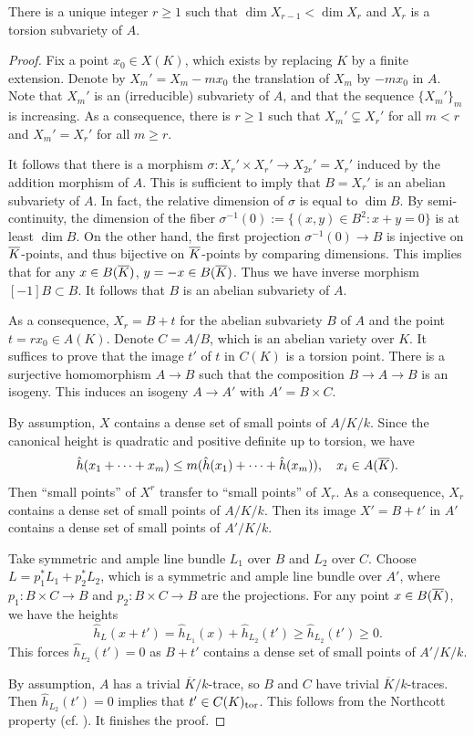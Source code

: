 \begin{lem}
\notready \label{addition}
There is a unique integer $r\geq 1$ such that $\dim X_{r-1}<\dim X_r$ and $X_r$ is a torsion subvariety of $A$.
\end{lem}
\begin{proof}
Fix a point $x_0\in X(K)$, which exists by replacing $K$ by a finite extension.
Denote by
$X_m'=X_m-mx_0$
the translation of $X_m$ by $-mx_0$ in $A$.
Note that $X_m'$ is an (irreducible) subvariety of $A$, and that the sequence
$\{X_m'\}_m$ is increasing.
As a consequence, there is $r\geq 1$ such that $X_m'\subsetneq X_r'$ for all $m<r$ and $X_m'= X_r'$ for all $m\geq r$.

It follows that there is a morphism $\sigma: X_r' \times X_r' \to X_{2r}' = X_r'$ induced by the addition morphism of $A$. This is sufficient to imply that $B=X_r'$ is an abelian subvariety of $A$.
In fact, the relative dimension of $\sigma$ is equal to $\dim B$.
By semi-continuity, the dimension of the fiber $\sigma^{-1}(0):=\{(x,y)\in B^2:x+y=0\}$ is at least $\dim B$.
On the other hand, the first projection $\sigma^{-1}(0)\to B$ is injective on ${\overline{K}}$-points, and thus bijective on ${\overline{K}}$-points by comparing dimensions.
This implies that for any $x\in B({\overline{K}})$, $y=-x\in B({\overline{K}})$.
Thus we have inverse morphism $[-1]B \subset B$.
It follows that $B$ is an abelian subvariety of $A$.

As a consequence, $X_r=B+t$ for the abelian subvariety $B$ of $A$ and the point $t=rx_0\in A(K)$.
Denote $C=A/B$, which is an abelian variety over $K$.
It suffices to prove that the image $t'$ of $t$ in $C(K)$ is a torsion point.
There is a surjective homomorphism $A \to B$ such that the composition $B\to A \to B$ is an isogeny.
This induces an isogeny $A\to A'$ with $A'=B\times C$.

By assumption, $X$ contains a dense set of small points of $A/K/k$.
Since the canonical height is quadratic and positive definite up to torsion, we have
$$
\hat h(x_1+ \cdots+ x_m)\leq  m(\hat h(x_1)+ \cdots +\hat h(x_m)), \quad x_i\in A({\overline{K}}).
$$
Then ``small points'' of $X^r$ transfer to ``small points'' of $X_r$.
As a consequence, $X_r$ contains a dense set of small points of $A/K/k$.
Then its image $X'=B+t'$ in $A'$ contains a dense set of small points of $A'/K/k$.

Take symmetric and ample line bundle $L_1$ over $B$ and $L_2$ over $C$.
Choose $L=p_1^*L_1+p_2^*L_2$, which is a symmetric and ample line bundle over $A'$, where $p_1:B\times C\to B$ and $p_2:B\times C\to B$ are the projections.
For any point $x\in B({\overline{K}})$, we have the heights
$$
\hat h_L(x+t')= \hat h_{L_1}(x)+\hat h_{L_2}(t') \geq \hat h_{L_2}(t') \geq 0.
$$
This forces $\hat h_{L_2}(t')=0$ as $B+t'$ contains a dense set of small points of $A'/K/k$.

By assumption, $A$ has a trivial $\overline K/ k$-trace, so
$B$ and $C$ have trivial $\overline K/ k$-traces.
Then $\hat h_{L_2}(t')=0$ implies that $t'\in C(K)_{\mathrm{tor}}$.
This follows from the Northcott property (cf. \cite[Theorem 9.15]{Conrad}).
It finishes the proof.
\end{proof}



